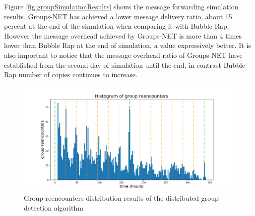 Figure \ref{fig:groupSimulationResults} shows the message forwarding simulation results. Groups-NET has achieved a lower message delivery ratio, about 15 percent at the end of the simulation when comparing it with Bubble Rap. However the message overhead achieved by Groups-NET is more than 4 times lower than Bubble Rap at the end of simulation, a value expressively better. It is also important to notice that the message overhead ratio of Groups-NET have established from the second day of simulation until the end, in contrast Bubble Rap number of copies continues to increase.

\begin{figure}
	\includegraphics[width=\linewidth]{imgs/groups-net/group-reencounters.png}
    \caption{Group reencounters distribution results of the distributed group detection algorithm}
    \label{fig:groupReencounters}
\end{figure}

